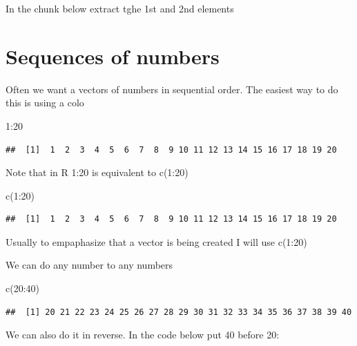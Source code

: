 \documentclass[
]{book}
\newenvironment{Shaded}{\begin{snugshade}}{\end{snugshade}}
\newcommand{\DecValTok}[1]{\textcolor[rgb]{0.00,0.00,0.81}{#1}}
\newcommand{\FunctionTok}[1]{\textcolor[rgb]{0.00,0.00,0.00}{#1}}
\newcommand{\NormalTok}[1]{#1}
\newcommand{\SpecialCharTok}[1]{\textcolor[rgb]{0.00,0.00,0.00}{#1}}
\begin{document}
In the chunk below extract tghe 1st and 2nd elements

\hypertarget{sequences-of-numbers}{%
\section{Sequences of numbers}\label{sequences-of-numbers}}

Often we want a vectors of numbers in sequential order. The easiest way to do this is using a colo

\begin{Shaded}
\begin{Highlighting}[]
\DecValTok{1}\SpecialCharTok{:}\DecValTok{20}
\end{Highlighting}
\end{Shaded}

\begin{verbatim}
##  [1]  1  2  3  4  5  6  7  8  9 10 11 12 13 14 15 16 17 18 19 20
\end{verbatim}

Note that in R 1:20 is equivalent to c(1:20)

\begin{Shaded}
\begin{Highlighting}[]
\FunctionTok{c}\NormalTok{(}\DecValTok{1}\SpecialCharTok{:}\DecValTok{20}\NormalTok{)}
\end{Highlighting}
\end{Shaded}

\begin{verbatim}
##  [1]  1  2  3  4  5  6  7  8  9 10 11 12 13 14 15 16 17 18 19 20
\end{verbatim}

Usually to empaphasize that a vector is being created I will use c(1:20)

We can do any number to any numbers

\begin{Shaded}
\begin{Highlighting}[]
\FunctionTok{c}\NormalTok{(}\DecValTok{20}\SpecialCharTok{:}\DecValTok{40}\NormalTok{)}
\end{Highlighting}
\end{Shaded}

\begin{verbatim}
##  [1] 20 21 22 23 24 25 26 27 28 29 30 31 32 33 34 35 36 37 38 39 40
\end{verbatim}

We can also do it in reverse. In the code below put 40 before 20:
\end{document}
